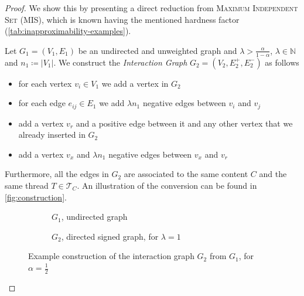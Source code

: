 \begin{proof}
	We show this by presenting a direct reduction from \textsc{Maximum
		Independent Set} (MIS), which is known having the mentioned hardness
	factor (\autoref{tab:inapproximability-examples}).

	\bigskip
	Let $G_{1}  = (V_{1} ,E_{1} )$ be an undirected and unweighted graph and
	$\lambda > \frac{\alpha }{1 - \alpha }$, $\lambda \in \mathbb{N} $ and $n_{1} \coloneqq |V_{1}| $.
	We construct the \emph{Interaction Graph} ${G}_{2}  = (V_{2} , E^{+}_{2} , E
			^{-}_{2} ) $ as follows

	\begin{itemize}
		\item for each vertex $v_{i}  \in V_{1} $ we add a vertex in $G_{2} $
		\item for each edge $e_{ij}  \in
			      E_{1} $ we add $\lambda n_{1} $ negative edges between $v_{i} $ and $v_{j} $
		\item add a vertex $v_r$ and a positive edge between it and any other
		      vertex that we already inserted in $G_2$
		\item add a vertex $v_x$ and $\lambda n_{1} $ negative edges between $v_x$
		      and $v_{r} $
	\end{itemize}

	Furthermore, all the edges in $G_{2} $ are associated to the same content
	$C$ and the same thread $T \in \mathcal{T}_{C}  $.
	An illustration of the conversion can be found in \autoref{fig:construction}.

	\begin{figure}[b]
		\begin{center}
			\begin{subfigure}{0.4\textwidth}
				\centering
				\vspace{10pt}
				\caption{$G_{1}$, undirected graph}
				\label{fig:g1_example}
			\end{subfigure}
			\begin{subfigure}{0.4\textwidth}
				\centering
				\caption{$G_{2}$, directed signed graph, for $\lambda = 1$}
				\label{fig:g2_example}
			\end{subfigure}
		\end{center}
		\caption[Example reduction from MIP to \acrshort{ECP}]{Example construction of the interaction graph $G_{2} $ from
			$G_{1} $, for $\alpha = \frac{1}{2} $}
		\label{fig:construction}
	\end{figure}


\end{proof}
